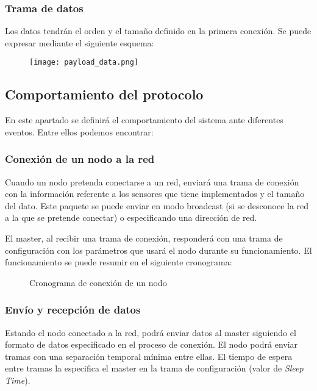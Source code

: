 \subsubsection{Trama de datos}

	
	Los datos tendrán el orden y el tamaño definido en la primera conexión. Se puede expresar mediante el siguiente esquema:
	
	\begin{figure}[!h]
		\texttt{[image: payload\_data.png]}
		\centering
	\end{figure}
	
\subsection{Comportamiento del protocolo}
 En este apartado se definirá el comportamiento del sistema ante diferentes eventos. Entre ellos podemos encontrar:
	\subsubsection{Conexión de un nodo a la red}
	
	Cuando un nodo pretenda conectarse a un red, enviará una trama de conexión con la información referente a los sensores que tiene implementados y el tamaño del dato. Este paquete se puede enviar en modo broadcast (si se desconoce la red a la que se pretende conectar) o especificando una dirección de red. 
	
	El master, al recibir una trama de conexión, responderá con una trama de configuración con los parámetros que usará el nodo durante su funcionamiento. El funcionamiento se puede resumir en el siguiente cronograma:
	
	\begin{figure}[!h]
		\centering
		\caption{Cronograma de conexión de un nodo}
		\label{fig:crono}
	\end{figure}
	
	
	\subsubsection{Envío y recepción de datos}
	
	Estando el nodo conectado a la red, podrá enviar datos al master siguiendo el formato de datos especificado en el proceso de conexión. El nodo podrá enviar tramas con una separación temporal mínima entre ellas. El tiempo de espera entre tramas la especifica el master en la trama de configuración (valor de \textit{Sleep Time}).
	
